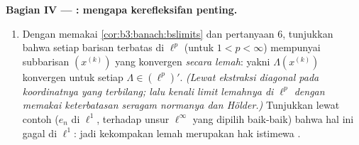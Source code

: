 \begin{problem}[{Soal akhir pekan --- $(\ell^p)' = \ell^q$,
kerefleksifan, dan keanehan $\ell^\infty$}]
\medskip
\noindent\textbf{Bagian IV --- : mengapa kerefleksifan
penting.}
\begin{enumerate}[resume]
  \item Dengan memakai \cref{cor:b3:banach:bslimits} dan pertanyaan 6,
        tunjukkan bahwa setiap barisan terbatas di $\ell^p$ (untuk $1 < p <
        \infty$) mempunyai subbarisan $(x^{(k)})$ yang konvergen
        \emph{secara lemah}: yakni $\Lambda(x^{(k)})$ konvergen untuk setiap
        $\Lambda \in (\ell^p)'$. \emph{(Lewat ekstraksi diagonal pada
        koordinatnya yang terbilang; lalu kenali limit lemahnya
        di $\ell^p$ dengan memakai keterbatasan seragam normanya dan
        Hölder.)} Tunjukkan lewat contoh ($e_n$ di $\ell^1$, terhadap
        unsur $\ell^\infty$ yang dipilih baik-baik) bahwa hal ini gagal
        di $\ell^1$: jadi kekompakan lemah merupakan hak istimewa .
\end{enumerate}


\end{problem}
